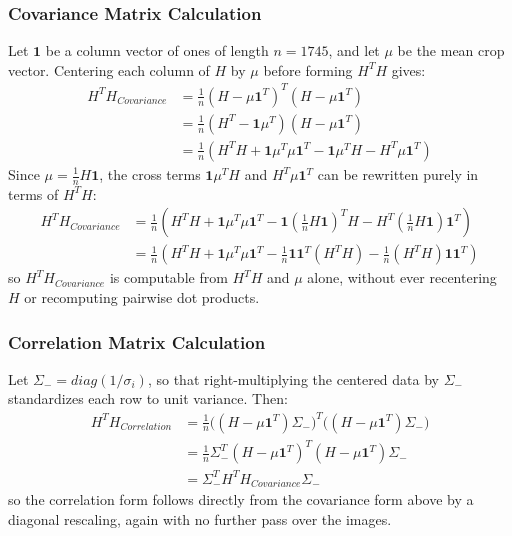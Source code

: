 \documentclass[a4paper,11pt]{article}
\begin{document}
\subsubsection{Covariance Matrix Calculation}
Let $\mathbf{1}$ be a column vector of ones of length $n=1745$, and let
$\mu$ be the mean crop vector. Centering each column of $H$ by $\mu$ before
forming $H^TH$ gives:
\begin{align*}
    H^TH_{Covariance} &= \frac{1}{n}(H-\mu\mathbf{1}^T)^T(H-\mu\mathbf{1}^T)\\
    &= \frac{1}{n}(H^T-\mathbf{1}\mu^T)(H-\mu\mathbf{1}^T)\\
    &= \frac{1}{n}(H^TH+\mathbf{1}\mu^T\mu\mathbf{1}^T-\mathbf{1}\mu^TH-H^T\mu\mathbf{1}^T)
\end{align*}
Since $\mu = \frac{1}{n}H\mathbf{1}$, the cross terms $\mathbf{1}\mu^TH$ and
$H^T\mu\mathbf{1}^T$ can be rewritten purely in terms of $H^TH$:
\begin{align*}
    H^TH_{Covariance} &= \frac{1}{n}\left(H^TH+\mathbf{1}\mu^T\mu\mathbf{1}^T-\mathbf{1}\left(\frac{1}{n}H\mathbf{1}\right)^TH-H^T\left(\frac{1}{n}H\mathbf{1}\right)\mathbf{1}^T\right)\\
    &= \frac{1}{n}\left(H^TH + \mathbf{1}\mu^T\mu\mathbf{1}^T - \frac{1}{n}\mathbf{1}\mathbf{1}^T(H^TH) - \frac{1}{n}(H^TH)\mathbf{1}\mathbf{1}^T\right)
\end{align*}
so $H^TH_{Covariance}$ is computable from $H^TH$ and $\mu$ alone, without
ever recentering $H$ or recomputing pairwise dot products.

\subsubsection{Correlation Matrix Calculation}
Let $\Sigma_- = diag(1/\sigma_i)$, so that right-multiplying the centered
data by $\Sigma_-$ standardizes each row to unit variance. Then:
\begin{align*}
    H^TH_{Correlation} &= \frac{1}{n}\big((H-\mu\mathbf{1}^T)\Sigma_-\big)^T\big((H-\mu\mathbf{1}^T)\Sigma_-\big)\\
    &= \frac{1}{n}\Sigma_-^T(H-\mu\mathbf{1}^T)^T(H-\mu\mathbf{1}^T)\Sigma_-\\
    &= \Sigma_-^TH^TH_{Covariance}\Sigma_-
\end{align*}
so the correlation form follows directly from the covariance form above by
a diagonal rescaling, again with no further pass over the images.
\end{document}
